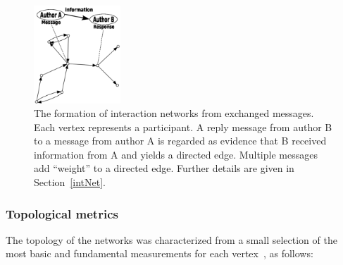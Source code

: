 \documentclass[%
aip,
jmp,%
amsmath,amssymb,
reprint,%
]{revtex4-1}
\begin{document}
\begin{figure}[!h]
\centering
\includegraphics[width=0.29\textwidth]{figs/criaRede3_}
\caption{The formation of interaction networks from exchanged messages. Each vertex represents a participant. A reply message from author B to a message from author A is regarded as evidence that B received information from A and yields a directed edge. 	Multiple messages add ``weight'' to a directed edge. Further details are given in Section~\ref{intNet}.}
\label{formationNetwork}
\end{figure}


\subsubsection{Topological metrics}\label{measures}

The topology of the networks was characterized 
from a small selection of the most basic 
and fundamental measurements for each vertex~\cite{newmanBook}, as follows:
\end{document}
